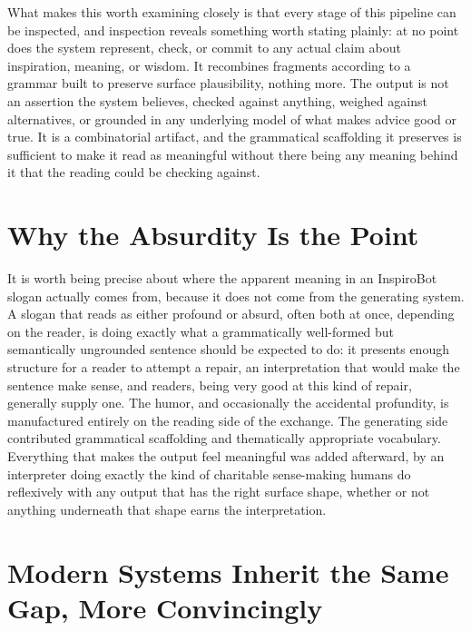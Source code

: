 What makes this worth examining closely is that every stage of this pipeline can be inspected, and inspection reveals something worth stating plainly: at no point does the system represent, check, or commit to any actual claim about inspiration, meaning, or wisdom. It recombines fragments according to a grammar built to preserve surface plausibility, nothing more. The output is not an assertion the system believes, checked against anything, weighed against alternatives, or grounded in any underlying model of what makes advice good or true. It is a combinatorial artifact, and the grammatical scaffolding it preserves is sufficient to make it read as meaningful without there being any meaning behind it that the reading could be checking against.

\section{Why the Absurdity Is the Point}

It is worth being precise about where the apparent meaning in an InspiroBot slogan actually comes from, because it does not come from the generating system. A slogan that reads as either profound or absurd, often both at once, depending on the reader, is doing exactly what a grammatically well-formed but semantically ungrounded sentence should be expected to do: it presents enough structure for a reader to attempt a repair, an interpretation that would make the sentence make sense, and readers, being very good at this kind of repair, generally supply one. The humor, and occasionally the accidental profundity, is manufactured entirely on the reading side of the exchange. The generating side contributed grammatical scaffolding and thematically appropriate vocabulary. Everything that makes the output feel meaningful was added afterward, by an interpreter doing exactly the kind of charitable sense-making humans do reflexively with any output that has the right surface shape, whether or not anything underneath that shape earns the interpretation.

\section{Modern Systems Inherit the Same Gap, More Convincingly}

